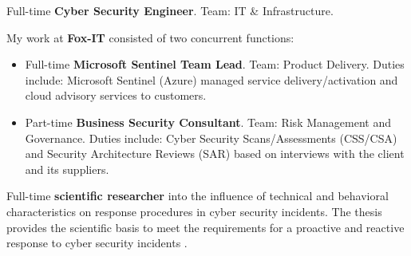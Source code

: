 \documentclass[10pt,a4paper,ragged2e,withhyper]{altacv}
\begin{document}
\tagline{}

\makecvheader
{}
\begin{paracol}{2}


\small{Full-time \textbf{Cyber Security Engineer}. Team: IT \& Infrastructure.}

\divider

\small{My work at \textbf{Fox-IT} consisted of two concurrent functions:}\smallskip

\begin{itemize}
    \item Full-time \textbf{Microsoft Sentinel Team Lead}. Team: Product Delivery. Duties include: Microsoft Sentinel (Azure) managed service delivery/activation and cloud advisory services to customers.
    \item Part-time \textbf{Business Security Consultant}. Team: Risk Management and Governance. Duties include: Cyber Security Scans/Assessments (CSS/CSA) and Security Architecture Reviews (SAR) based on interviews with the client and its suppliers.
\end{itemize}
   
\divider

\small{Full-time \textbf{scientific researcher} into the influence of technical and behavioral characteristics on response procedures in cyber security incidents. The thesis provides the scientific basis to meet the requirements for a proactive and reactive response to cyber security incidents \parencite{Douma2021}.}

\divider


\end{paracol}
\end{document}
